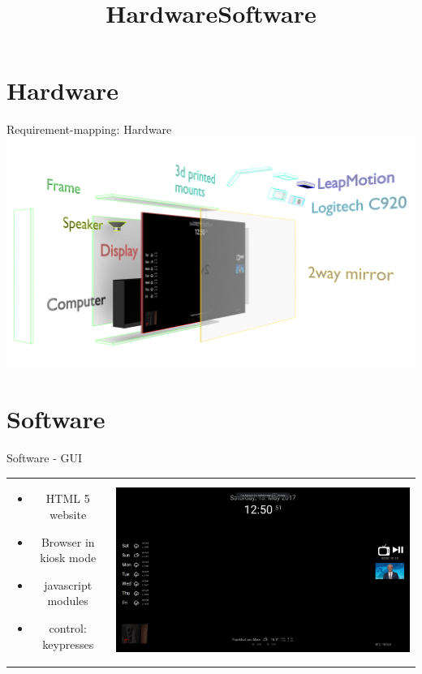 \documentclass[xcolor=svgnames,handout,aspectratio=169]{beamer}
\begin{document}
\section{Hardware}
\title[Hardware]{Hardware}

\begin{frame}
	{Requirement-mapping: Hardware}
	\includegraphics[width=\linewidth]{images/mirror_split_color}
\end{frame}


\section{Software}
\title[Software]{Software}

\begin{frame}
	{Software - GUI}
	\begin{tabular}{cl}  
			\parbox{0.35\linewidth}{
				\begin{itemize}
					\item HTML 5 website
					\item Browser in kiosk mode
					\item javascript modules
					\item control: keypresses
				\end{itemize}
			}&
			\parbox{0.6\linewidth}{			
				\includegraphics[width=\linewidth]{images/gui.png}
			}
		\end{tabular}
\end{frame}
\end{document}
